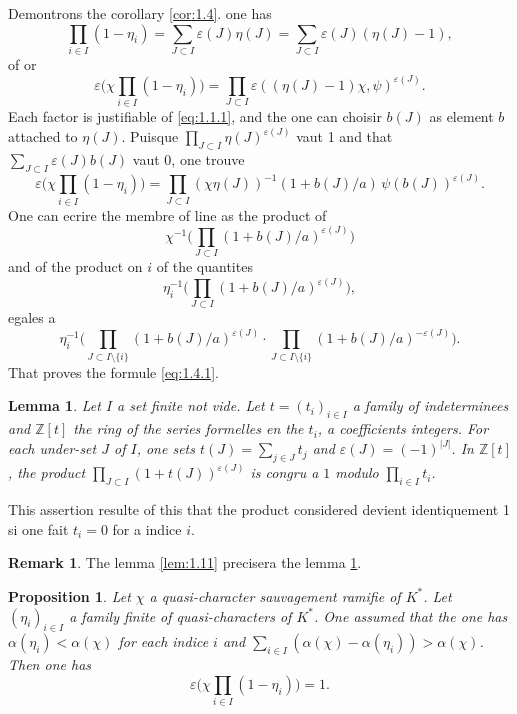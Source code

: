 \documentclass[12pt,a4paper]{article}
\theoremstyle{plain}
\newtheorem{lemma}[theorem]{Lemma}
\newtheorem{proposition}[theorem]{Proposition}
\theoremstyle{definition}
\newtheorem{remark}[theorem]{Remark}
\theoremstyle{remark}
\newcommand{\bZ}{\mathbb{Z}}
\begin{document}
Demontrons the corollary \ref{cor:1.4}. one has
\[
\prod_{i \in I}(1-\eta_i) = \sum_{J \subset I} \varepsilon(J) \eta(J) = \sum_{J \subset I} \varepsilon(J)(\eta(J)-1),
\]
of or
\[
\varepsilon\biggl(\chi \prod_{i \in I}(1-\eta_i)\biggr) = \prod_{J \subset I} \varepsilon((\eta(J)-1)\chi, \psi)^{\varepsilon(J)}.
\]
Each factor is justifiable of \eqref{eq:1.1.1}, and the one can choisir $b(J)$ as element $b$ attached to $\eta(J)$. Puisque $\prod_{J \subset I} \eta(J)^{\varepsilon(J)}$ vaut 1 and that $\sum_{J \subset I} \varepsilon(J) b(J)$ vaut 0, one trouve
\[
\varepsilon\biggl(\chi \prod_{i \in I}(1-\eta_i)\biggr) = \prod_{J \subset I} (\chi\eta(J))^{-1}(1+b(J)/a) \, \psi(b(J))^{\varepsilon(J)}.
\]
One can ecrire the membre of line as the product of
\[
\chi^{-1}\biggl(\prod_{J \subset I} (1+b(J)/a)^{\varepsilon(J)}\biggr)
\]
and of the product on $i$ of the quantites
\[
\eta_i^{-1}\biggl(\prod_{J \subset I} (1+b(J)/a)^{\varepsilon(J)}\biggr),
\]
egales a
\[
\eta_i^{-1}\biggl(\prod_{J \subset I \setminus \{i\}} (1+b(J)/a)^{\varepsilon(J)} \cdot \prod_{J \subset I \setminus \{i\}} (1+b(J)/a)^{-\varepsilon(J)}\biggr).
\]
That proves the formule \eqref{eq:1.4.1}.

\begin{lemma}\label{lem:1.6}
Let $I$ a set finite not vide. Let $t = (t_i)_{i \in I}$ a family of indeterminees and $\bZ[t]$ the ring of the series formelles en the $t_i$, a coefficients integers. For each under-set $J$ of $I$, one sets $t(J) = \sum_{j \in J} t_j$ and $\varepsilon(J) = (-1)^{|J|}$. In $\bZ[t]$, the product $\prod_{J \subset I} (1+t(J))^{\varepsilon(J)}$ is congru a $1$ modulo $\prod_{i \in I} t_i$.
\end{lemma}

This assertion resulte of this that the product considered devient identiquement 1 si one fait $t_i = 0$ for a indice $i$.

\begin{remark}
The lemma \ref{lem:1.11} precisera the lemma \ref{lem:1.6}.
\end{remark}

\begin{proposition}\label{prop:1.7}
Let $\chi$ a quasi-character sauvagement ramifie of $K^*$. Let $(\eta_i)_{i \in I}$ a family finite of quasi-characters of $K^*$. One assumed that the one has $\alpha(\eta_i) < \alpha(\chi)$ for each indice $i$ and $\sum_{i \in I}(\alpha(\chi) - \alpha(\eta_i)) > \alpha(\chi)$. Then one has
\[
\varepsilon\biggl(\chi \prod_{i \in I}(1-\eta_i)\biggr) = 1.
\]
\end{proposition}
\end{document}
